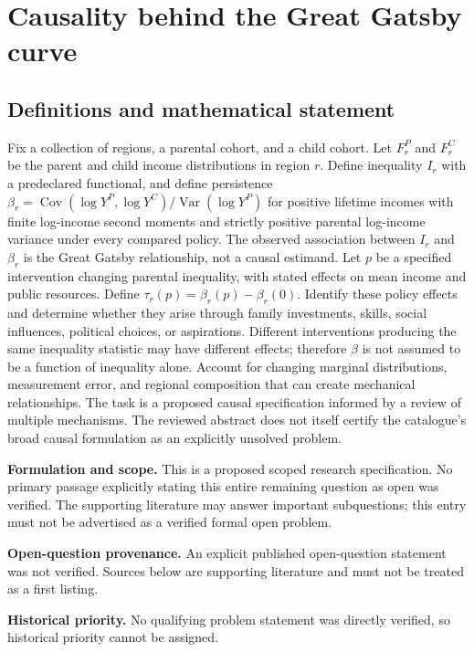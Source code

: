 \documentclass[11pt]{article}
\begin{document}
\section*{Causality behind the Great Gatsby curve}\label{30007650}
\subsection{Definitions and mathematical statement}
Fix a collection of regions, a parental cohort, and a child cohort. Let \(F^P_r\) and \(F^C_r\) be the parent and child income distributions in region \(r\). Define inequality \(I_r\) with a predeclared functional, and define persistence \(\beta_r=\operatorname{Cov}(\log Y^P,\log Y^C)/\operatorname{Var}(\log Y^P)\) for positive lifetime incomes with finite log-income second moments and strictly positive parental log-income variance under every compared policy. The observed association between \(I_r\) and \(\beta_r\) is the Great Gatsby relationship, not a causal estimand. Let \(p\) be a specified intervention changing parental inequality, with stated effects on mean income and public resources. Define \(\tau_r(p)=\beta_r(p)-\beta_r(0)\). Identify these policy effects and determine whether they arise through family investments, skills, social influences, political choices, or aspirations. Different interventions producing the same inequality statistic may have different effects; therefore \(\beta\) is not assumed to be a function of inequality alone. Account for changing marginal distributions, measurement error, and regional composition that can create mechanical relationships. The task is a proposed causal specification informed by a review of multiple mechanisms. The reviewed abstract does not itself certify the catalogue's broad causal formulation as an explicitly unsolved problem.

\par\textbf{Formulation and scope.} This is a proposed scoped research specification. No primary passage explicitly stating this entire remaining question as open was verified. The supporting literature may answer important subquestions; this entry must not be advertised as a verified formal open problem.

\par\textbf{Open-question provenance.} An explicit published open-question statement was not verified. Sources below are supporting literature and must not be treated as a first listing.

\par\textbf{Historical priority.} No qualifying problem statement was directly verified, so historical priority cannot be assigned.
\end{document}

